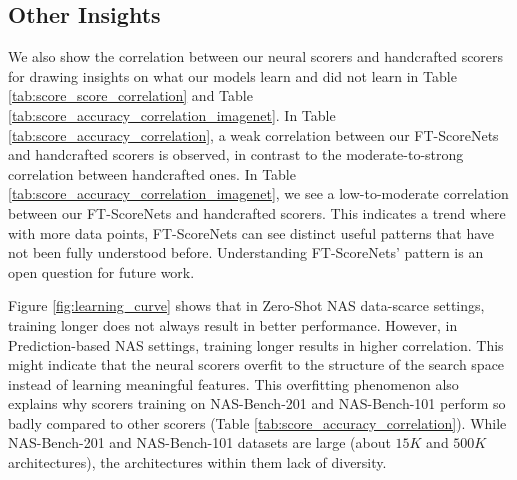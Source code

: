 \documentclass[lettersize,journal]{IEEEtran}
\begin{document}
    \subsection{Other Insights}
        We also show the correlation between our neural scorers and handcrafted scorers for drawing insights on what our models learn and did not learn in Table \ref{tab:score_score_correlation} and Table \ref{tab:score_accuracy_correlation_imagenet}. In Table \ref{tab:score_accuracy_correlation}, a weak correlation between our FT-ScoreNets and handcrafted scorers is observed, in contrast to the moderate-to-strong correlation between handcrafted ones. In Table \ref{tab:score_accuracy_correlation_imagenet}, we see a low-to-moderate correlation between our FT-ScoreNets and handcrafted scorers. This indicates a trend where with more data points, FT-ScoreNets can see distinct useful patterns that have not been fully understood before. Understanding FT-ScoreNets' pattern is an open question for future work.

        Figure \ref{fig:learning_curve} shows that in Zero-Shot NAS data-scarce settings, training longer does not always result in better performance. However, in Prediction-based NAS settings, training longer results in higher correlation. This might indicate that the neural scorers overfit to the structure of the search space instead of learning meaningful features. This overfitting phenomenon also explains why scorers training on NAS-Bench-201 and NAS-Bench-101 perform so badly compared to other scorers (Table \ref{tab:score_accuracy_correlation}). While NAS-Bench-201 and NAS-Bench-101 datasets are large (about $15K$ and $500K$ architectures), the architectures within them lack of diversity.
    
\end{document}
